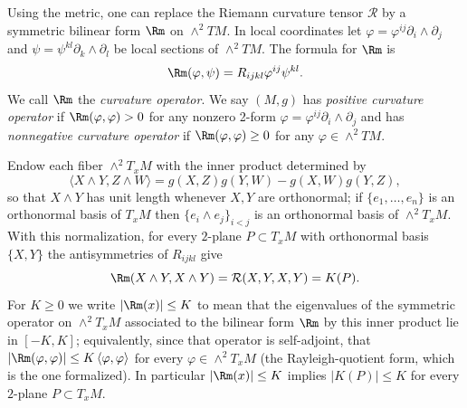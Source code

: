 \begin{definition}
\label{def:curvature-operator}
\leanok
Using the metric, one can replace the Riemann curvature tensor
${\mathcal R}$ by  a symmetric bilinear form $\Rm$ on
$\wedge^2TM$. In local coordinates let
$\varphi=\varphi^{ij}\partial_i\wedge\partial _j$ and
$\psi=\psi^{kl}\partial _k\wedge\partial_l$ be local sections of
$\wedge^2TM$. The formula for $\Rm$ is
\[ \Rm(\varphi, \psi)=R_{ijkl}\varphi^{ij}\psi^{kl}. \]
We call $\Rm$ the \textit{curvature
operator}. We say $(M,g)$ has
\textit{positive curvature operator} if $\Rm(\varphi,\varphi)>0$ for any nonzero 2-form $\varphi =
\varphi^{ij}\partial_{i}\wedge
\partial_{j}$ and has \textit{nonnegative curvature operator} if
$\Rm(\varphi,\varphi)\geq0$ for any  $\varphi\in \wedge^2TM$.
\end{definition}

\begin{definition}
\label{def:curvature-operator-norm}
\leanok
Endow each fiber $\wedge^2T_xM$ with the inner product determined
by
$$\langle X\wedge Y,Z\wedge W\rangle
=g(X,Z)g(Y,W)-g(X,W)g(Y,Z),$$
so that $X\wedge Y$ has unit length whenever $X,Y$ are orthonormal;
if $\{e_1,\ldots,e_n\}$ is an orthonormal basis of $T_xM$ then
$\{e_i\wedge e_j\}_{i<j}$ is an orthonormal basis of
$\wedge^2T_xM$. With this normalization, for every $2$-plane
$P\subset T_xM$ with orthonormal basis $\{X,Y\}$ the antisymmetries
of $R_{ijkl}$ give
$$\Rm(X\wedge Y,X\wedge Y)={\mathcal R}(X,Y,X,Y)=K(P).$$
For $K\ge0$ we write $|\Rm(x)|\le K$ to mean that the eigenvalues
of the symmetric operator on $\wedge^2T_xM$ associated to the
bilinear form $\Rm$ by this inner product lie in $[-K,K]$;
equivalently, since that operator is self-adjoint, that
$|\Rm(\varphi,\varphi)|\le K\,\langle\varphi,\varphi\rangle$ for every
$\varphi\in\wedge^2T_xM$ (the Rayleigh-quotient form, which is the one
formalized). In
particular $|\Rm(x)|\le K$ implies $|K(P)|\le K$ for every
$2$-plane $P\subset T_xM$.
\end{definition}

